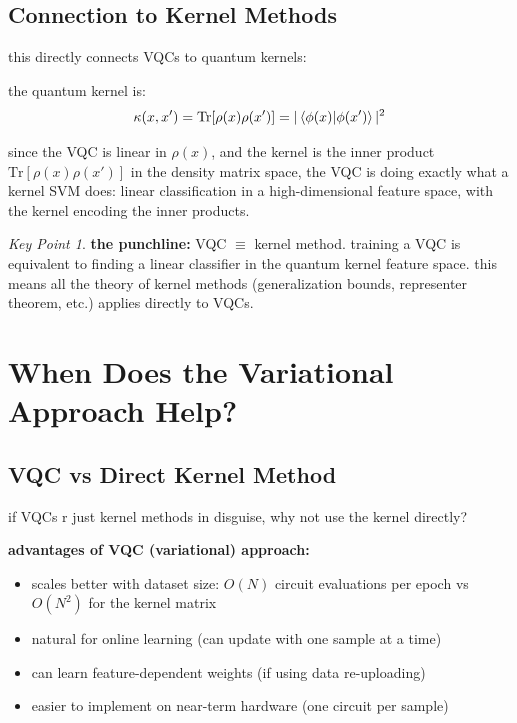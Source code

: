 \documentclass[11pt,a4paper]{article}
\theoremstyle{definition}
\theoremstyle{remark}
\newtheorem*{keypoint}{Key Point}
\begin{document}
\subsection{Connection to Kernel Methods}

this directly connects VQCs to quantum kernels:

the quantum kernel is:
\[
\kappa(x, x') = \text{Tr}[\rho(x)\rho(x')] = |\braket{\phi(x)|\phi(x')}|^2
\]

since the VQC is linear in $\rho(x)$, and the kernel is the inner product $\text{Tr}[\rho(x)\rho(x')]$ in the density matrix space, the VQC is doing exactly what a kernel SVM does: linear classification in a high-dimensional feature space, with the kernel encoding the inner products.

\begin{keypoint}
\textbf{the punchline:} VQC $\equiv$ kernel method. training a VQC is equivalent to finding a linear classifier in the quantum kernel feature space. this means all the theory of kernel methods (generalization bounds, representer theorem, etc.) applies directly to VQCs.
\end{keypoint}

\section{When Does the Variational Approach Help?}

\subsection{VQC vs Direct Kernel Method}

if VQCs r just kernel methods in disguise, why not use the kernel directly?

\textbf{advantages of VQC (variational) approach:}
\begin{itemize}
    \item scales better with dataset size: $O(N)$ circuit evaluations per epoch vs $O(N^2)$ for the kernel matrix
    \item natural for online learning (can update with one sample at a time)
    \item can learn feature-dependent weights (if using data re-uploading)
    \item easier to implement on near-term hardware (one circuit per sample)
\end{itemize}
\end{document}
